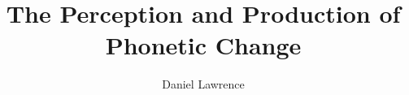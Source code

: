 \documentclass{article}[hidelinks]\usepackage[]{graphicx}\usepackage[]{color}
\begin{document}
\linespread{1.5}
  \title{The Perception and Production of Phonetic Change}


\author{Daniel Lawrence}
\date{}
\maketitle
\end{document}
